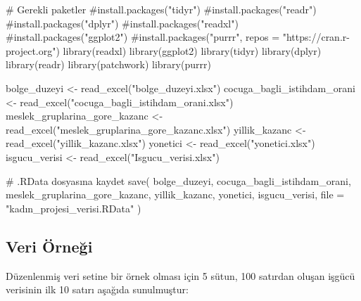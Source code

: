 \documentclass[
  11pt,
  a4paper,
  DIV=11,
  numbers=noendperiod]{scrartcl}
\newenvironment{Shaded}{\begin{snugshade}}{\end{snugshade}}
\newcommand{\AttributeTok}[1]{\textcolor[rgb]{0.40,0.45,0.13}{#1}}
\newcommand{\CommentTok}[1]{\textcolor[rgb]{0.37,0.37,0.37}{#1}}
\newcommand{\FunctionTok}[1]{\textcolor[rgb]{0.28,0.35,0.67}{#1}}
\newcommand{\NormalTok}[1]{\textcolor[rgb]{0.00,0.23,0.31}{#1}}
\newcommand{\OtherTok}[1]{\textcolor[rgb]{0.00,0.23,0.31}{#1}}
\newcommand{\StringTok}[1]{\textcolor[rgb]{0.13,0.47,0.30}{#1}}
\begin{document}
\begin{Shaded}
\begin{Highlighting}[]
\CommentTok{\# Gerekli paketler}
\CommentTok{\#install.packages("tidyr")}
\CommentTok{\#install.packages("readr")}
\CommentTok{\#install.packages("dplyr")}
\CommentTok{\#install.packages("readxl")}
\CommentTok{\#install.packages("ggplot2")}
\CommentTok{\#install.packages("purrr", repos = "https://cran.r{-}project.org")}
\FunctionTok{library}\NormalTok{(readxl)}
\FunctionTok{library}\NormalTok{(ggplot2)}
\FunctionTok{library}\NormalTok{(tidyr)}
\FunctionTok{library}\NormalTok{(dplyr)}
\FunctionTok{library}\NormalTok{(readr)}
\FunctionTok{library}\NormalTok{(patchwork)}
\FunctionTok{library}\NormalTok{(purrr)}

\NormalTok{bolge\_duzeyi }\OtherTok{\textless{}{-}} \FunctionTok{read\_excel}\NormalTok{(}\StringTok{"bolge\_duzeyi.xlsx"}\NormalTok{)}
\NormalTok{cocuga\_bagli\_istihdam\_orani }\OtherTok{\textless{}{-}} \FunctionTok{read\_excel}\NormalTok{(}\StringTok{"cocuga\_bagli\_istihdam\_orani.xlsx"}\NormalTok{)}
\NormalTok{meslek\_gruplarina\_gore\_kazanc }\OtherTok{\textless{}{-}} \FunctionTok{read\_excel}\NormalTok{(}\StringTok{"meslek\_gruplarina\_gore\_kazanc.xlsx"}\NormalTok{)}
\NormalTok{yillik\_kazanc }\OtherTok{\textless{}{-}} \FunctionTok{read\_excel}\NormalTok{(}\StringTok{"yillik\_kazanc.xlsx"}\NormalTok{)}
\NormalTok{yonetici }\OtherTok{\textless{}{-}} \FunctionTok{read\_excel}\NormalTok{(}\StringTok{"yonetici.xlsx"}\NormalTok{)}
\NormalTok{isgucu\_verisi }\OtherTok{\textless{}{-}} \FunctionTok{read\_excel}\NormalTok{(}\StringTok{"Isgucu\_verisi.xlsx"}\NormalTok{)}

\CommentTok{\# .RData dosyasına kaydet}
\FunctionTok{save}\NormalTok{(}
\NormalTok{  bolge\_duzeyi,}
\NormalTok{  cocuga\_bagli\_istihdam\_orani,}
\NormalTok{  meslek\_gruplarina\_gore\_kazanc,}
\NormalTok{  yillik\_kazanc,}
\NormalTok{  yonetici,}
\NormalTok{  isgucu\_verisi,}
  \AttributeTok{file =} \StringTok{"kadın\_projesi\_verisi.RData"}
\NormalTok{)}
\end{Highlighting}
\end{Shaded}

\subsection{Veri Örneği}\label{veri-uxf6rneux11fi}

Düzenlenmiş veri setine bir örnek olması için 5 sütun, 100 satırdan
oluşan işgücü verisinin ilk 10 satırı aşağıda sunulmuştur:
\end{document}
